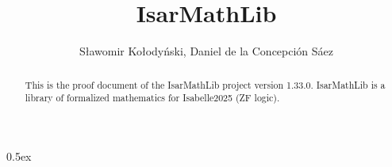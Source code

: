 \documentclass[11pt,a4paper]{article}
\begin{document}
\title{IsarMathLib}
\author{S\l awomir Ko\l ody\'{n}ski, Daniel de la Concepci\'{o}n S\'{a}ez}
\maketitle

\begin{abstract}
This is the proof document of the IsarMathLib project version 1.33.0. 
IsarMathLib is a library of formalized mathematics for Isabelle2025 (ZF logic). 
 
\end{abstract}

\tableofcontents

\parindent 0pt\parskip 0.5ex





\end{document}
